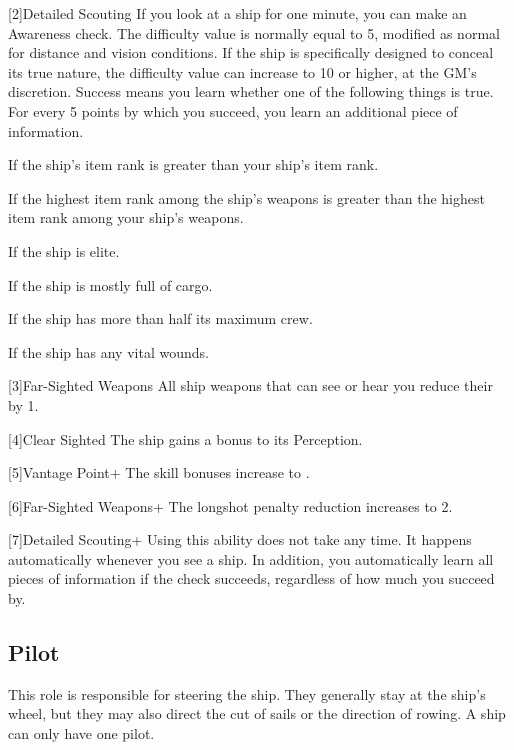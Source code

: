     [2]{Detailed Scouting} If you look at a ship for one minute, you can make an Awareness check.
      The difficulty value is normally equal to 5, modified as normal for distance and vision conditions.
      If the ship is specifically designed to conceal its true nature, the difficulty value can increase to 10 or higher, at the GM's discretion.
      Success means you learn whether one of the following things is true.
      For every 5 points by which you succeed, you learn an additional piece of information.
      \begin{raggeditemize}
        \item If the ship's item rank is greater than your ship's item rank.
        \item If the highest item rank among the ship's weapons is greater than the highest item rank among your ship's weapons.
        \item If the ship is elite.
        \item If the ship is mostly full of cargo.
        \item If the ship has more than half its maximum crew.
        \item If the ship has any vital wounds.
      \end{raggeditemize}

    [3]{Far-Sighted Weapons} All ship weapons that can see or hear you reduce their  by 1.

    [4]{Clear Sighted} The ship gains a  bonus to its Perception.

    [5]{Vantage Point+} The skill bonuses increase to .

    [6]{Far-Sighted Weapons+} The longshot penalty reduction increases to 2.

    [7]{Detailed Scouting+} Using this ability does not take any time.
      It happens automatically whenever you see a ship.
      In addition, you automatically learn all pieces of information if the check succeeds, regardless of how much you succeed by.

  \subsection{Pilot}
    This role is responsible for steering the ship.
    They generally stay at the ship's wheel, but they may also direct the cut of sails or the direction of rowing.
    A ship can only have one pilot.

